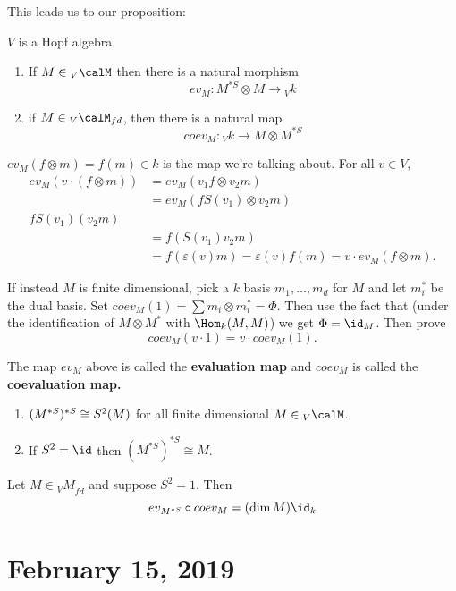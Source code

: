 \documentclass[12pt]{article}
\let\tilde\relax
\newcommand*{\tilde}[1]{\widetilde{#1}}
\begin{document}
This leads us to our proposition:
\begin{thm}
	$V$ is a Hopf algebra.
	\begin{enumerate}
		\item If $M\in{_V\calM}$ then there is a natural morphism
		\[ev_M:M^{*S}\otimes M\to {_Vk}\]
		\item if $M\in{_V\calM_{fd}}$, then there is a natural map
		\[coev_M:{_Vk}\to M\otimes M^{*S}\]
	\end{enumerate}
\end{thm}
\begin{prf}
	$ev_M(f\otimes m)=f(m)\in k$ is the map we're talking about. For all $v\in V$, 
	\begin{align*}
		ev_M(v\cdot(f\otimes m))&=ev_M(v_1f\otimes v_2 m)\\
		&=ev_M(fS(v_1)\otimes v_2m)\\
		fS(v_1)(v_2 m)\\
		&= f(S(v_1)v_2m)\\
		&= f(\varepsilon(v) m)=\varepsilon(v)f(m)=v\cdot ev_M(f\otimes m).
	\end{align*}

	If instead $M$ is finite dimensional, pick a $k$ basis $m_1,\dots,m_d$ for $M$ and let 
	$m_i^*$ be the dual basis. Set $coev_M(1)=\sum m_i\otimes m_i^*=\Phi$. Then use the fact that (under the identification of 
	$M\otimes M^*$ with $\Hom_k(M,M)$) we get $\Phi=\id_M$. Then prove 
	\[coev_M(v\cdot 1)=v\cdot coev_M(1).\]
\end{prf}
\begin{defn}
	The map $ev_M$ above is called the \textbf{evaluation map} and $coev_M$ is called the 
	\textbf{coevaluation map.}
\end{defn}

\begin{lem}
	\begin{enumerate}
		\item $(M^{*S})^{*S}\cong \tilde S^2(M)$ for all finite dimensional $M\in{_V\calM}$.
		\item If $S^2=\id$ then $(M^{*S})^{*S}\cong M$.
	\end{enumerate}
\end{lem}
\begin{lem}
	Let $M\in {_VM}_{fd}$ and suppose $S^2=1$. Then 
	\[ev_{M^{*S}}\circ coev_M=(\dim M)\id_k\]
\end{lem}

\section{February 15, 2019}
\end{document}
